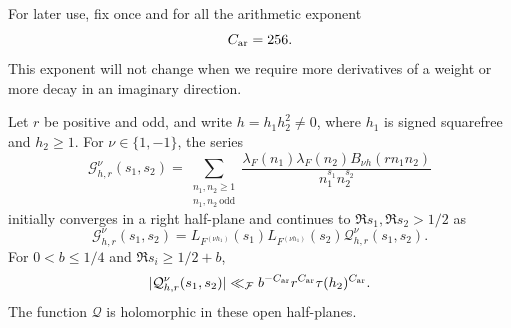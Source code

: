 For later use, fix once and for all the arithmetic exponent
\begin{equation}\label{analytic:arithmetic-exponent}
 C_{\rm ar}=256.
\end{equation}
This exponent will not change when we require more derivatives of a
weight or more decay in an imaginary direction.

\begin{lemma}\label{analytic:euler}
Let $r$ be positive and odd, and write $h=h_1h_2^2\ne0$, where $h_1$ is
signed squarefree and $h_2\geq1$. For $\nu\in\{1,-1\}$, the series
\[
 \mathcal G_{h,r}^{\nu}(s_1,s_2)=
 \sum_{\substack{n_1,n_2\geq1\\n_1,n_2\ \mathrm{odd}}}
 \frac{\lambda_F(n_1)\lambda_F(n_2)B_{\nu h}(rn_1n_2)}
      {n_1^{s_1}n_2^{s_2}}
\]
initially converges in a right half-plane and continues to
$\Re s_1,\Re s_2>1/2$ as
\begin{equation}\label{analytic:euler-factorization}
 \mathcal G_{h,r}^{\nu}(s_1,s_2)=
 L_{F^{(\nu h_1)}}(s_1)L_{F^{(\nu h_1)}}(s_2)
 \mathcal Q_{h,r}^{\nu}(s_1,s_2).
\end{equation}
For $0<b\leq1/4$ and $\Re s_i\geq1/2+b$,
\begin{equation}\label{analytic:euler-bound}
 |\mathcal Q_{h,r}^{\nu}(s_1,s_2)|
 \ll_{\mathcal F} b^{-C_{\rm ar}}r^{C_{\rm ar}}
                       \tau(h_2)^{C_{\rm ar}}.
\end{equation}
The function $\mathcal Q$ is holomorphic in these open half-planes.
\end{lemma}

